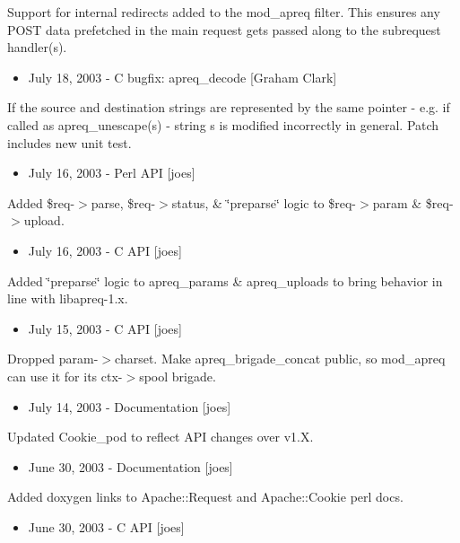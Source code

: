 Support for internal redirects added to the mod\_\-apreq filter. This ensures any POST data prefetched in the main request gets passed along to the subrequest handler(s).

\begin{itemize}
\item July 18, 2003 - C bugfix: apreq\_\-decode [Graham Clark]\end{itemize}


If the source and destination strings are represented by the same pointer - e.g. if called as apreq\_\-unescape(s) - string s is modified incorrectly in general. Patch includes new unit test.

\begin{itemize}
\item July 16, 2003 - Perl API [joes]\end{itemize}


Added \$req-$>$parse, \$req-$>$status, \& \char`\"{}preparse\char`\"{} logic to \$req-$>$param \& \$req-$>$upload.

\begin{itemize}
\item July 16, 2003 - C API [joes]\end{itemize}


Added \char`\"{}preparse\char`\"{} logic to apreq\_\-params \& apreq\_\-uploads to bring behavior in line with libapreq-1.x.

\begin{itemize}
\item July 15, 2003 - C API [joes]\end{itemize}


Dropped param-$>$charset. Make apreq\_\-brigade\_\-concat public, so mod\_\-apreq can use it for its ctx-$>$spool brigade.

\begin{itemize}
\item July 14, 2003 - Documentation [joes]\end{itemize}


Updated Cookie\_\-pod to reflect API changes over v1.X.

\begin{itemize}
\item June 30, 2003 - Documentation [joes]\end{itemize}


Added doxygen links to Apache::Request and Apache::Cookie perl docs.

\begin{itemize}
\item June 30, 2003 - C API [joes]\end{itemize}


